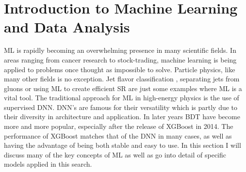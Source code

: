 \chapter{Introduction to Machine Learning and Data Analysis}\label{chap:Intro ML}
\acf{ML} is rapidly becoming an overwhelming presence in many scientific fields.
In areas ranging from cancer research to stock-trading, machine learning is being applied to problems
once thought as impossible to solve. Particle physics, like many other fields is no exception. Jet flavor classification \cite{Guest_2016}, 
separating jets from gluons \cite{PhysRevD.44.2025} or using \ac{ML} to create efficient \ac{SR} are just some examples
where \ac{ML} is a vital tool. The traditional approach for ML in high-energy physics is the use of supervised
\ac{DNN}. \ac{DNN}'s are famous for their versatility which is partly due to their diversity in architecture and 
application. In later years \ac{BDT} have become more and more popular, especially after the release of XGBoost 
in 2014. The performance of XGBoost matches that of the \ac{DNN} in many cases, as well as having the advantage 
of being both stable and easy to use. In this section I will discuss many of the key concepts of \ac{ML} as 
well as go into detail of specific models applied in this search.

